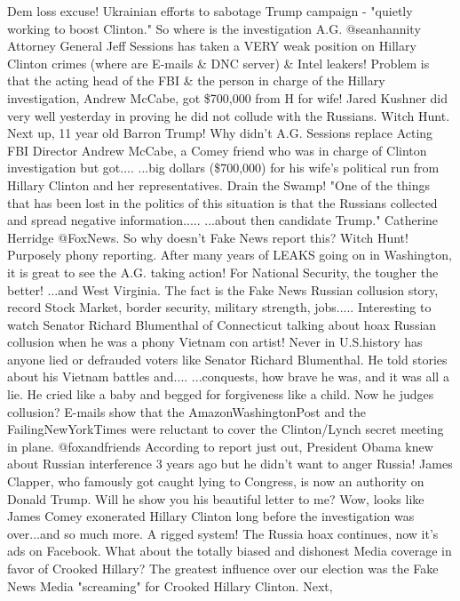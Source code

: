 Dem loss excuse! Ukrainian efforts to sabotage Trump campaign - "quietly
working to boost Clinton." So where is the investigation A.G.
@seanhannity Attorney General Jeff Sessions has taken a VERY weak
position on Hillary Clinton crimes (where are E-mails \& DNC server) \&
Intel leakers! Problem is that the acting head of the FBI \& the person
in charge of the Hillary investigation, Andrew McCabe, got \$700,000
from H for wife! Jared Kushner did very well yesterday in proving he did
not collude with the Russians. Witch Hunt. Next up, 11 year old Barron
Trump! Why didn't A.G. Sessions replace Acting FBI Director Andrew
McCabe, a Comey friend who was in charge of Clinton investigation but
got.... ...big dollars (\$700,000) for his wife's political run from
Hillary Clinton and her representatives. Drain the Swamp! "One of the
things that has been lost in the politics of this situation is that the
Russians collected and spread negative information..... ...about then
candidate Trump." Catherine Herridge @FoxNews. So why doesn't Fake News
report this? Witch Hunt! Purposely phony reporting. After many years of
LEAKS going on in Washington, it is great to see the A.G. taking action!
For National Security, the tougher the better! ...and West Virginia. The
fact is the Fake News Russian collusion story, record Stock Market,
border security, military strength, jobs..... Interesting to watch
Senator Richard Blumenthal of Connecticut talking about hoax Russian
collusion when he was a phony Vietnam con artist! Never in U.S.history
has anyone lied or defrauded voters like Senator Richard Blumenthal. He
told stories about his Vietnam battles and.... ...conquests, how brave
he was, and it was all a lie. He cried like a baby and begged for
forgiveness like a child. Now he judges collusion? E-mails show that the
AmazonWashingtonPost and the FailingNewYorkTimes were reluctant to cover
the Clinton/Lynch secret meeting in plane. @foxandfriends According to
report just out, President Obama knew about Russian interference 3 years
ago but he didn't want to anger Russia! James Clapper, who famously got
caught lying to Congress, is now an authority on Donald Trump. Will he
show you his beautiful letter to me? Wow, looks like James Comey
exonerated Hillary Clinton long before the investigation was over...and
so much more. A rigged system! The Russia hoax continues, now it's ads
on Facebook. What about the totally biased and dishonest Media coverage
in favor of Crooked Hillary? The greatest influence over our election
was the Fake News Media "screaming" for Crooked Hillary Clinton. Next,

